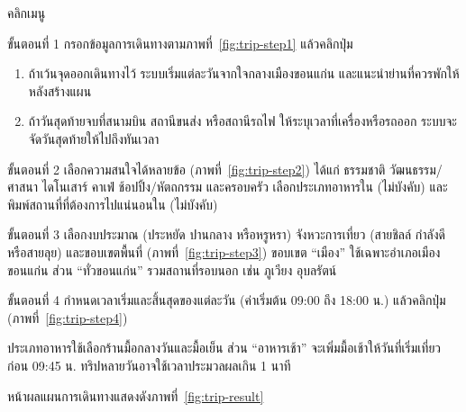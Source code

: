 \begin{steps}
  \item คลิกเมนู 
  \item ขั้นตอนที่ 1 กรอกข้อมูลการเดินทางตามภาพที่~\ref{fig:trip-step1} แล้วคลิกปุ่ม 
        \begin{enumerate}
          \item ถ้าเว้นจุดออกเดินทางไว้ ระบบเริ่มแต่ละวันจากใจกลางเมืองขอนแก่น และแนะนำย่านที่ควรพักให้หลังสร้างแผน
          \item ถ้าวันสุดท้ายจบที่สนามบิน สถานีขนส่ง หรือสถานีรถไฟ ให้ระบุเวลาที่เครื่องหรือรถออก ระบบจะจัดวันสุดท้ายให้ไปถึงทันเวลา
        \end{enumerate}
  \item ขั้นตอนที่ 2 เลือกความสนใจได้หลายข้อ (ภาพที่~\ref{fig:trip-step2}) ได้แก่ ธรรมชาติ วัฒนธรรม/ศาสนา ไดโนเสาร์ คาเฟ่ ช้อปปิ้ง/หัตถกรรม และครอบครัว เลือกประเภทอาหารใน  (ไม่บังคับ) และพิมพ์สถานที่ที่ต้องการไปแน่นอนใน  (ไม่บังคับ)
  \item ขั้นตอนที่ 3 เลือกงบประมาณ (ประหยัด ปานกลาง หรือหรูหรา) จังหวะการเที่ยว (สายชิลล์ กำลังดี หรือสายลุย) และขอบเขตพื้นที่ (ภาพที่~\ref{fig:trip-step3}) ขอบเขต ``เมือง'' ใช้เฉพาะอำเภอเมืองขอนแก่น ส่วน ``ทั่วขอนแก่น'' รวมสถานที่รอบนอก เช่น ภูเวียง อุบลรัตน์
  \item ขั้นตอนที่ 4 กำหนดเวลาเริ่มและสิ้นสุดของแต่ละวัน (ค่าเริ่มต้น 09:00 ถึง 18:00 น.) แล้วคลิกปุ่ม  (ภาพที่~\ref{fig:trip-step4})
\end{steps}





\begin{note}
ประเภทอาหารใช้เลือกร้านมื้อกลางวันและมื้อเย็น ส่วน ``อาหารเช้า'' จะเพิ่มมื้อเช้าให้วันที่เริ่มเที่ยวก่อน 09:45 น. ทริปหลายวันอาจใช้เวลาประมวลผลเกิน 1 นาที
\end{note}

หน้าผลแผนการเดินทางแสดงดังภาพที่~\ref{fig:trip-result}

